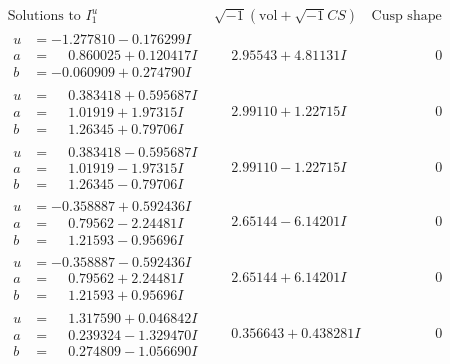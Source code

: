\documentclass[1p]{elsarticle_modified}
\theoremstyle{definition}
\newcommand{\I}{\sqrt{-1}}
\begin{document}
$$\begin{array}{c|c|c}
\text{Solutions to }I^u_{1}& \I (\text{vol} + \sqrt{-1}CS) & \text{Cusp shape}\\
 \hline 
\begin{aligned}
u &= -1.277810 - 0.176299 I \\
a &= \phantom{-}0.860025 + 0.120417 I \\
b &= -0.060909 + 0.274790 I\end{aligned}
 & \phantom{-}2.95543 + 4.81131 I & \phantom{-0.000000 } 0 \\ \hline\begin{aligned}
u &= \phantom{-}0.383418 + 0.595687 I \\
a &= \phantom{-}1.01919 + 1.97315 I \\
b &= \phantom{-}1.26345 + 0.79706 I\end{aligned}
 & \phantom{-}2.99110 + 1.22715 I & \phantom{-0.000000 } 0 \\ \hline\begin{aligned}
u &= \phantom{-}0.383418 - 0.595687 I \\
a &= \phantom{-}1.01919 - 1.97315 I \\
b &= \phantom{-}1.26345 - 0.79706 I\end{aligned}
 & \phantom{-}2.99110 - 1.22715 I & \phantom{-0.000000 } 0 \\ \hline\begin{aligned}
u &= -0.358887 + 0.592436 I \\
a &= \phantom{-}0.79562 - 2.24481 I \\
b &= \phantom{-}1.21593 - 0.95696 I\end{aligned}
 & \phantom{-}2.65144 - 6.14201 I & \phantom{-0.000000 } 0 \\ \hline\begin{aligned}
u &= -0.358887 - 0.592436 I \\
a &= \phantom{-}0.79562 + 2.24481 I \\
b &= \phantom{-}1.21593 + 0.95696 I\end{aligned}
 & \phantom{-}2.65144 + 6.14201 I & \phantom{-0.000000 } 0 \\ \hline\begin{aligned}
u &= \phantom{-}1.317590 + 0.046842 I \\
a &= \phantom{-}0.239324 - 1.329470 I \\
b &= \phantom{-}0.274809 - 1.056690 I\end{aligned}
 & \phantom{-}0.356643 + 0.438281 I & \phantom{-0.000000 } 0 \\ \hline\begin{aligned}

\end{aligned}
\end{array}$$
\end{document}
